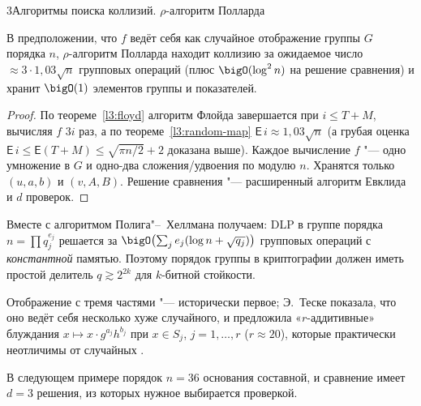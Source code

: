 \begin{lecture}{3}{Алгоритмы поиска коллизий. \texorpdfstring{$\rho$}{ρ}-алгоритм Полларда}
\begin{theorem}\label{l3:rho-complexity}
В предположении, что $f$ ведёт себя как случайное отображение группы $G$ порядка $n$,
$\rho$-алгоритм Полларда находит коллизию за ожидаемое число $\approx 3 \cdot 1{,}03\sqrt n$
групповых операций (плюс $\bigO(\log^2 n)$ на решение сравнения) и хранит $\bigO(1)$
элементов группы и показателей.
\end{theorem}

\begin{proof}
По теореме~\ref{l3:floyd} алгоритм Флойда завершается при $i \le T + M$, вычисляя $f$ $3i$
раз, а по теореме~\ref{l3:random-map} $\mathsf{E}\, i \approx 1{,}03\sqrt n$ (а грубая
оценка $\mathsf{E}\, i \le \mathsf{E}(T + M) \le \sqrt{\pi n/2} + 2$ доказана выше).
Каждое вычисление $f$ "--- одно умножение в $G$ и одно-два сложения/удвоения по модулю $n$.
Хранятся только $(u, a, b)$ и $(v, A, B)$. Решение сравнения "--- расширенный алгоритм Евклида
и $d$ проверок.
\end{proof}

Вместе с алгоритмом Полига"--~Хеллмана получаем: DLP в группе порядка
$n = \prod q_j^{e_j}$ решается за $\bigO\bigl(\sum_j e_j(\log n + \sqrt{q_j})\bigr)$ групповых
операций с \emph{константной} памятью. Поэтому порядок группы в криптографии должен иметь
простой делитель $q \gtrsim 2^{2k}$ для $k$-битной стойкости.

\begin{remark}
Отображение с тремя частями "--- исторически первое; Э.~Теске показала, что оно ведёт себя
несколько хуже случайного, и предложила «$r$-аддитивные» блуждания
$x \mapsto x \cdot g^{a_j} h^{b_j}$ при $x \in S_j$, $j = 1, \dots, r$ ($r \approx 20$),
которые практически неотличимы от случайных \cite[разд.~14.2]{galbraith}.
\end{remark}


В следующем примере порядок $n = 36$ основания составной, и сравнение имеет
$d = 3$ решения, из которых нужное выбирается проверкой.





\end{lecture}
